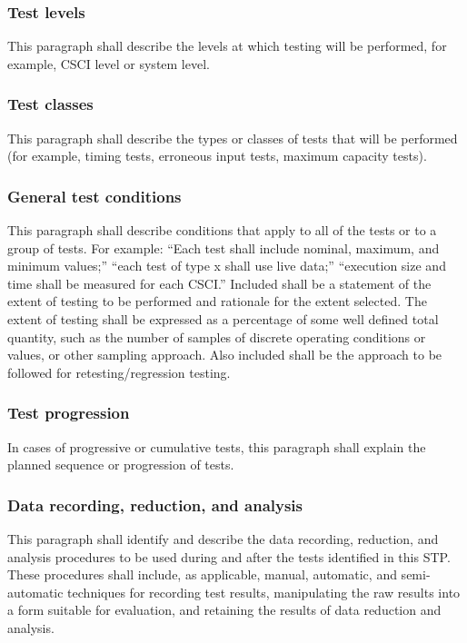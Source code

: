 \subsubsection{Test levels}

This paragraph shall describe the levels at which testing will be
performed, for example, CSCI level or system level.

\subsubsection{Test classes}

This paragraph shall describe the types or classes of tests that will be
performed (for example, timing tests, erroneous input tests, maximum
capacity tests).

\subsubsection{General test conditions}

This paragraph shall describe conditions that apply to all of the tests
or to a group of tests. For example: ``Each test shall include nominal,
maximum, and minimum values;'' ``each test of type x shall use live
data;'' ``execution size and time shall be measured for each CSCI.''
Included shall be a statement of the extent of testing to be performed
and rationale for the extent selected. The extent of testing shall be
expressed as a percentage of some well defined total quantity, such as
the number of samples of discrete operating conditions or values, or
other sampling approach. Also included shall be the approach to be
followed for retesting/regression testing.

\subsubsection{Test progression}

In cases of progressive or cumulative tests, this paragraph shall
explain the planned sequence or progression of tests.

\subsubsection{Data recording, reduction, and analysis}

This paragraph shall identify and describe the data recording,
reduction, and analysis procedures to be used during and after the tests
identified in this STP. These procedures shall include, as applicable,
manual, automatic, and semi-automatic techniques for recording test
results, manipulating the raw results into a form suitable for
evaluation, and retaining the results of data reduction and analysis.

